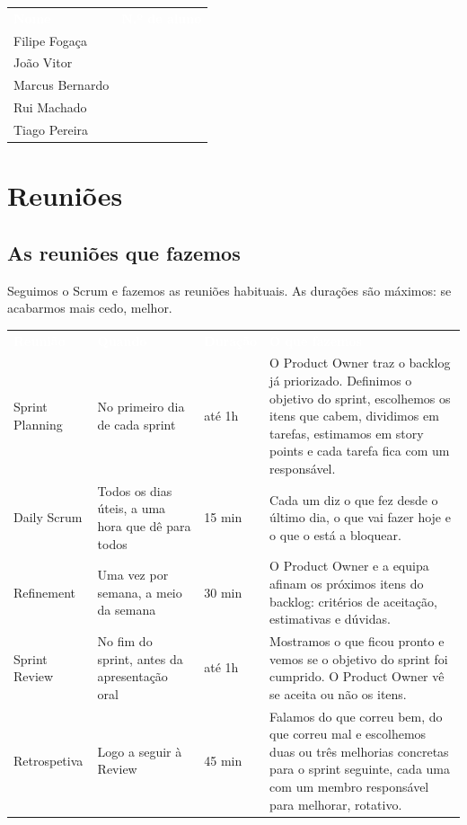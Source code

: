 \documentclass[11pt,a4paper]{article}
\newcommand{\th}[1]{\textcolor{white}{\sffamily\bfseries #1}}
\begin{document}
\renewcommand{\arraystretch}{2.2}
\begin{tabularx}{\textwidth}{Y L{5.2cm}}
   \th{Nome} & \th{N.º de aluno} \\
   Filipe Fogaça   & \\ \hline
          João Vitor      & \\ \hline
   Marcus Bernardo & \\ \hline
          Rui Machado     & \\ \hline
   Tiago Pereira   & \\ \hline
\end{tabularx}
\renewcommand{\arraystretch}{1}

\section{Reuniões}

\subsection{As reuniões que fazemos}

Seguimos o Scrum e fazemos as reuniões habituais. As durações são máximos: se acabarmos mais cedo, melhor.

\small
\renewcommand{\arraystretch}{1.45}
\begin{tabularx}{\textwidth}{N{2.5cm} L{3.2cm} L{1.7cm} Y}
   \th{Reunião} & \th{Quando} & \th{Duração} & \th{O que fazemos} \\
  Sprint Planning & No primeiro dia de cada sprint & até 1h &
    O Product Owner traz o backlog já priorizado. Definimos o objetivo do sprint, escolhemos os itens que cabem, dividimos em tarefas, estimamos em story points e cada tarefa fica com um responsável. \\
  Daily Scrum & Todos os dias úteis, a uma hora que dê para todos & 15 min &
    Cada um diz o que fez desde o último dia, o que vai fazer hoje e o que o está a bloquear. \\
  Refinement & Uma vez por semana, a meio da semana & 30 min &
    O Product Owner e a equipa afinam os próximos itens do backlog: critérios de aceitação, estimativas e dúvidas. \\
  Sprint Review & No fim do sprint, antes da apresentação oral & até 1h &
    Mostramos o que ficou pronto e vemos se o objetivo do sprint foi cumprido. O Product Owner vê se aceita ou não os itens. \\
  Retrospetiva & Logo a seguir à Review & 45 min &
    Falamos do que correu bem, do que correu mal e escolhemos duas ou três melhorias concretas para o sprint seguinte, cada uma com um membro responsável para melhorar, rotativo. \\
  \bottomrule
\end{tabularx}
\renewcommand{\arraystretch}{1}
\normalsize
\end{document}
